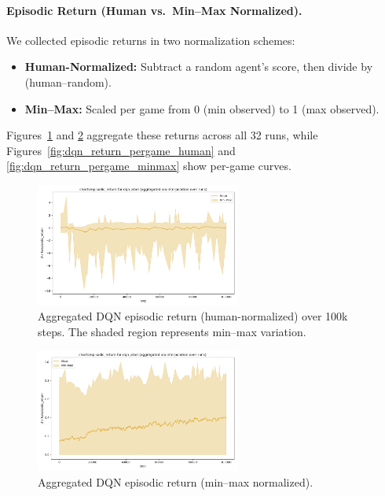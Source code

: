 \paragraph{Episodic Return (Human vs.\ Min--Max Normalized).}
We collected episodic returns in two normalization schemes:

\begin{itemize}
	\item \textbf{Human-Normalized:} Subtract a random agent’s score, 
	then divide by (human--random).
	\item \textbf{Min--Max:} Scaled per game from 0 (min observed) to 1 (max observed).
\end{itemize}

Figures~\ref{fig:dqn_return_human} and \ref{fig:dqn_return_minmax} aggregate 
these returns across all 32 runs, while 
Figures~\ref{fig:dqn_return_pergame_human} and \ref{fig:dqn_return_pergame_minmax} 
show per-game curves.

\begin{figure}[htbp]
	\centering
	\includegraphics[width=0.6\textwidth]{figures/dqn/charts_episodic_return_human_dqn_atari.png}
	\caption{Aggregated DQN episodic return (human-normalized) 
		over 100k steps. The shaded region represents min--max variation.}
	\label{fig:dqn_return_human}
\end{figure}

\begin{figure}[htbp]
	\centering
	\includegraphics[width=0.6\textwidth]{figures/dqn/charts_episodic_return_minmax_dqn_atari.png}
	\caption{Aggregated DQN episodic return (min--max normalized).}
	\label{fig:dqn_return_minmax}
\end{figure}

